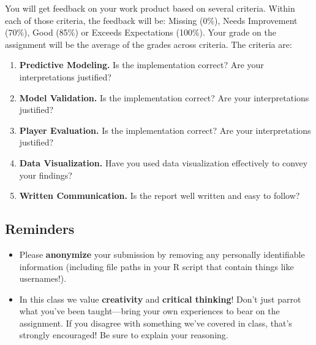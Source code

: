 \documentclass{article}
\begin{document}
      You will get feedback on your work product based on several criteria. Within each of those criteria, the feedback will be: Missing (0\%), Needs Improvement (70\%), Good (85\%) or Exceeds Expectations (100\%). Your grade on the assignment will be the average of the grades across criteria. The criteria are:
      \begin{enumerate}
        \item {\bf Predictive Modeling.} Is the implementation correct? Are your interpretations justified?
        \item {\bf Model Validation.} Is the implementation correct? Are your interpretations justified?
        \item {\bf Player Evaluation.} Is the implementation correct? Are your interpretations justified?
        \item {\bf Data Visualization.} Have you used data visualization effectively to convey your findings?
        \item {\bf Written Communication.} Is the report well written and easy to follow?
      \end{enumerate}

    \subsection*{\sc Reminders}

      \begin{itemize}
        \item Please {\bf anonymize} your submission by removing any personally identifiable information (including file paths in your R script that contain things like usernames!).
        \item In this class we value {\bf creativity} and {\bf critical thinking}! Don't just parrot what you've been taught---bring your own experiences to bear on the assignment. If you disagree with something we've covered in class, that's strongly encouraged! Be sure to explain your reasoning.
      \end{itemize}
\end{document}
